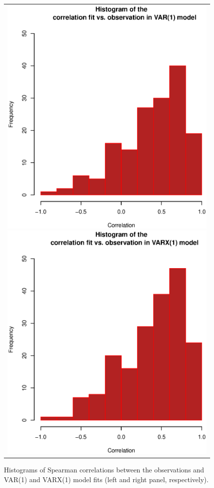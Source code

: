 \begin{figure}[h!]
\centering
\begin{tabular}{c}
\includegraphics[scale=0.4]{Figure_13a.eps}
\includegraphics[scale=0.4]{Figure_13b.eps}
\end{tabular}
\caption{Histograms of Spearman correlations between the observations and VAR(1) and VARX(1) model fits (left and right panel, respectively).}
\label{fig:compareVAR1-VARX1}  
\end{figure}
